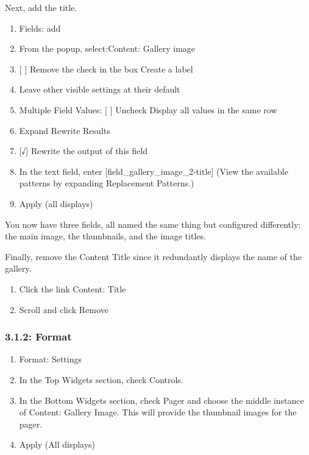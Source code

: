 \documentclass[letterpaper,10pt,english]{sphinxmanual}
\begin{document}
Next, add the title.
\begin{enumerate}
\item {} 
Fields: add

\item {} 
From the popup, select:Content: Gallery image

\item {} 
{[} {]} Remove the check in the box Create a label

\item {} 
Leave other visible settings at their default

\item {} 
Multiple Field Values: {[} {]} Uncheck Display all values in the same row

\item {} 
Expand Rewrite Results

\item {} 
{[}√{]} Rewrite the output of this field

\item {} 
In the text field, enter {[}field\_gallery\_image\_2-title{]} (View the available patterns by expanding Replacement Patterns.)

\item {} 
Apply (all displays)

\end{enumerate}

You now have three fields, all named the same thing but configured differently: the main image, the thumbnails, and the image titles.

Finally, remove the Content Title since it redundantly displays the name of the gallery.
\begin{enumerate}
\item {} 
Click the link Content: Title

\item {} 
Scroll and click Remove

\end{enumerate}


\subsubsection{3.1.2: Format}
\label{slides:format}\begin{enumerate}
\item {} 
Format: Settings

\item {} 
In the Top Widgets section, check Controls.

\item {} 
In the Bottom Widgets section, check Pager and choose the middle instance of Content: Gallery Image. This will provide the thumbnail images for the pager.

\item {} 
Apply (All displays)

\end{enumerate}
\end{document}
